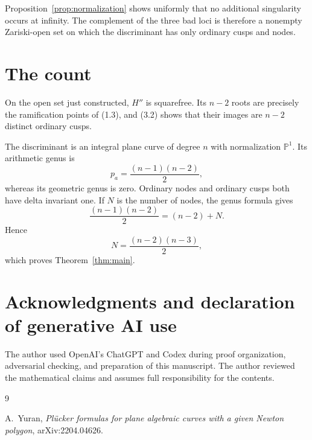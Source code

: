\documentclass[11pt]{article}
\newcommand{\Pone}{\mathbb P^1}
\begin{document}
Proposition~\ref{prop:normalization} shows uniformly that no additional
singularity occurs at infinity.  The complement of the three bad loci is
therefore a nonempty Zariski-open set on which the discriminant has only
ordinary cusps and nodes.

\section{The count}

On the open set just constructed, \(H''\) is squarefree.  Its \(n-2\) roots
are precisely the ramification points of (1.3), and (3.2) shows that their
images are \(n-2\) distinct ordinary cusps.

The discriminant is an integral plane curve of degree \(n\) with
normalization \(\Pone\).  Its arithmetic genus is
\[
  p_a=\frac{(n-1)(n-2)}2,
\]
whereas its geometric genus is zero.  Ordinary nodes and ordinary cusps
both have delta invariant one.  If \(N\) is the number of nodes, the genus
formula gives
\[
  \frac{(n-1)(n-2)}2=(n-2)+N.
\]
Hence
\[
  N=\frac{(n-2)(n-3)}2,
\]
which proves Theorem~\ref{thm:main}.

\section*{Acknowledgments and declaration of generative AI use}

The author used OpenAI's ChatGPT and Codex during proof organization,
adversarial checking, and preparation of this manuscript.  The author
reviewed the mathematical claims and assumes full responsibility for the
contents.

\begin{thebibliography}{9}

A.~Yuran,
\emph{Pl\"ucker formulas for plane algebraic curves with a given Newton
polygon},
arXiv:2204.04626.

\end{thebibliography}
\end{document}
